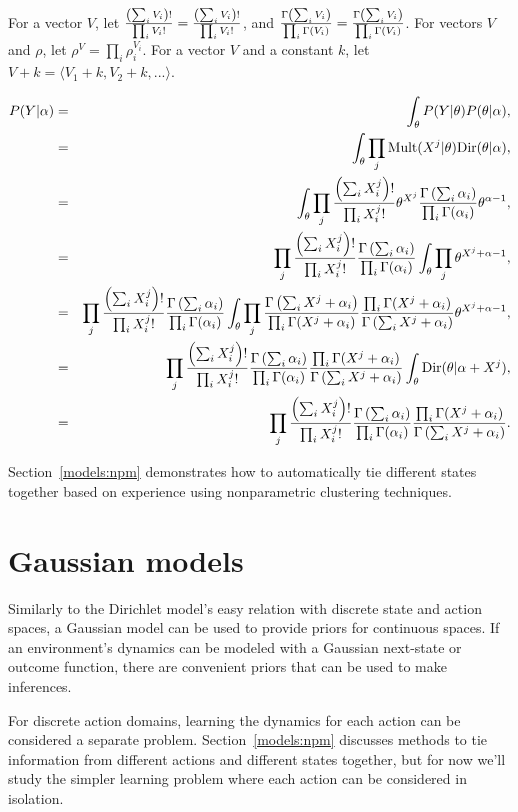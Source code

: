 For a vector $V$, let $\frac {\left(\sum_i V_i\right)!}{\prod_i V_i!} =\frac{\left(\sum_i V_i\right)!}{\prod_i V_i!}$, and $\frac {\Gamma\left(\sum_i V_i\right)}{\prod_i \Gamma(V_i)}=\frac{\Gamma\left(\sum_i V_i\right)}{\prod_i \Gamma(V_i)}$. For vectors $V$ and $\rho$, let $\rho^V=\prod_i \rho_i^{V_i}$. For a vector $V$ and a constant $k$, let $V+k=\langle V_1+k, V_2+k, ... \rangle$.

\begin{eqnarray}
P(Y|\alpha) &=& \int_\theta P(Y|\theta)P(\theta|\alpha),\\
&=& \int_\theta \prod_j \mbox{Mult}(X^j|\theta)\mbox{Dir}(\theta|\alpha),\\
&=& \int_\theta \prod_j \frac {\left(\sum_i X^j_i\right)!}{\prod_i X^j_i!} \theta^{X^j} \frac {\Gamma\left(\sum_i \alpha_i\right)}{\prod_i \Gamma(\alpha_i)} \theta^{\alpha-1},\\
&=& \prod_j \frac {\left(\sum_i X^j_i\right)!}{\prod_i X^j_i!} \frac {\Gamma\left(\sum_i \alpha_i\right)}{\prod_i \Gamma(\alpha_i)}  \int_\theta \prod_j \theta^{X^j+\alpha-1},\\
&=& \prod_j \frac {\left(\sum_i X^j_i\right)!}{\prod_i X^j_i!} \frac {\Gamma\left(\sum_i \alpha_i\right)}{\prod_i \Gamma(\alpha_i)}  \int_\theta \prod_j \frac {\Gamma\left(\sum_i X^j+\alpha_i\right)}{\prod_i \Gamma(X^j+\alpha_i)} \frac {\prod_i \Gamma(X^j+\alpha_i)}{\Gamma\left(\sum_i X^j+\alpha_i\right)} \theta^{X^j+\alpha-1},\\
&=& \prod_j \frac {\left(\sum_i X^j_i\right)!}{\prod_i X^j_i!} \frac {\Gamma\left(\sum_i \alpha_i\right)}{\prod_i \Gamma(\alpha_i)} \frac {\prod_i \Gamma(X^j+\alpha_i)}{\Gamma\left(\sum_i X^j+\alpha_i\right)} \int_\theta \mbox{Dir}(\theta|\alpha+X^j),\\
\label{models:eqn:tied-post}&=& \prod_j \frac {\left(\sum_i X^j_i\right)!}{\prod_i X^j_i!} \frac {\Gamma\left(\sum_i \alpha_i\right)}{\prod_i \Gamma(\alpha_i)} \frac {\prod_i \Gamma(X^j+\alpha_i)}{\Gamma\left(\sum_i X^j+\alpha_i\right)}.
\end{eqnarray}


Section~\ref{models:npm} demonstrates how to automatically tie different states together based on experience using nonparametric clustering techniques.

\section{Gaussian models}

Similarly to the Dirichlet model's easy relation with discrete state and action spaces, a Gaussian model can be used to provide priors for continuous spaces. If an environment's dynamics can be modeled with a Gaussian next-state or outcome function, there are convenient priors that can be used to make inferences.

 For discrete action domains, learning the dynamics for each action can be considered a separate problem. Section~\ref{models:npm} discusses methods to tie information from different actions and different states together, but for now we'll study the simpler learning problem where each action can be considered in isolation.

